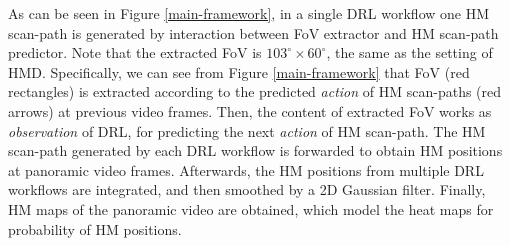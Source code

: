 \documentclass[10pt,journal,compsoc]{IEEEtran}
\begin{document}
As can be seen in Figure \ref{main-framework}, in a single DRL workflow one HM scan-path is generated by interaction between FoV extractor and HM scan-path predictor.
Note that the extracted FoV is $103^{\circ} \times 60^{\circ}$, the same as the setting of HMD.
Specifically, we can see from Figure \ref{main-framework} that FoV (red rectangles) is extracted according to the predicted \textit{action} of HM scan-paths (red arrows) at previous video frames.
Then, the content of extracted FoV works as \textit{observation} of DRL, for predicting the next \textit{action} of HM scan-path.
The HM scan-path generated by each DRL workflow is forwarded to obtain HM positions at panoramic video frames.
Afterwards, the HM positions from multiple DRL workflows are integrated, and then smoothed by a 2D Gaussian filter.
Finally, HM maps of the panoramic video are obtained, which model the heat maps for probability of HM positions.
\end{document}
